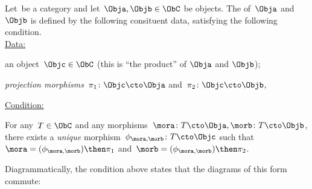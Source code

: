 \begin{ctdefinition}
  \label{def:categorical-product}
  Let~\CatC be a category and let~$\Obja, \Objb \in \ObC$ be objects. The \emph{} of~$\Obja$ and~$\Objb$ is defined by the following consituent data, satisfying the following condition. \\
  \underline{Data:}
  \begin{compactenum}
    \item an object~$\Objc \in \ObC$ (this is ``the product'' of $\Obja$  and $\Objb$);
    \item \emph{projection morphisms}~$\pi_1 \colon \Objc \cto \Obja$ and~$\pi_2 \colon \Objc \cto \Objb$,
  \end{compactenum}
  \underline{Condition:}
  \begin{compactenum}
    \item For any~$T \in \ObC$ and any morphisms~$\mora \colon T \cto \Obja, \morb \colon T \cto \Objb$, there exists a \emph{unique} morphism~$\phi_{\mora,\morb} \colon T \cto \Objc$ such that~$\mora = (\phi_{\mora,
      \morb})\then \pi_1$ and~$\morb=(\phi_{\mora, \morb})\then \pi_2$.
  \end{compactenum}
\end{ctdefinition}

\begin{remark}
  Diagrammatically, the condition above states that the diagrams of this form commute:
  \begin{center}
  \end{center}
\end{remark}

